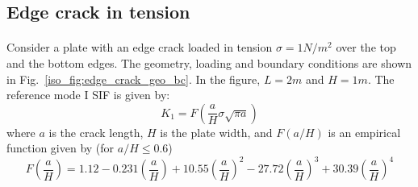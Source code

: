 \subsection{Edge crack in tension}

\paragraph{}
Consider a plate with an edge crack loaded in tension $\sigma=1N/m^2$ over the top and the bottom edges.
The geometry, loading and boundary conditions are shown in Fig.~\ref{iso_fig:edge_crack_geo_bc}.
In the figure, $L=2m$ and $H=1m$.
The reference mode \RN{1} SIF is given by:
    \begin{equation}
        K_1 = F\left(
            \frac{a}{H}
            \sigma \sqrt{\pi a}
        \label{iso_eq:edge_crack_k1}
        \right)
    \end{equation}
where $a$ is the crack length, $H$ is the plate width, and $F(a/H)$ is an empirical function given by (for $a/H \leq 0.6$)
    \begin{equation}
        F\left( \frac{a}{H} \right) =
            1.12 - 0.231 \left( \frac{a}{H} \right) +
            10.55\left( \frac{a}{H} \right)^2 -
            27.72\left( \frac{a}{H} \right)^3 +
            30.39\left( \frac{a}{H} \right)^4
    \end{equation}


